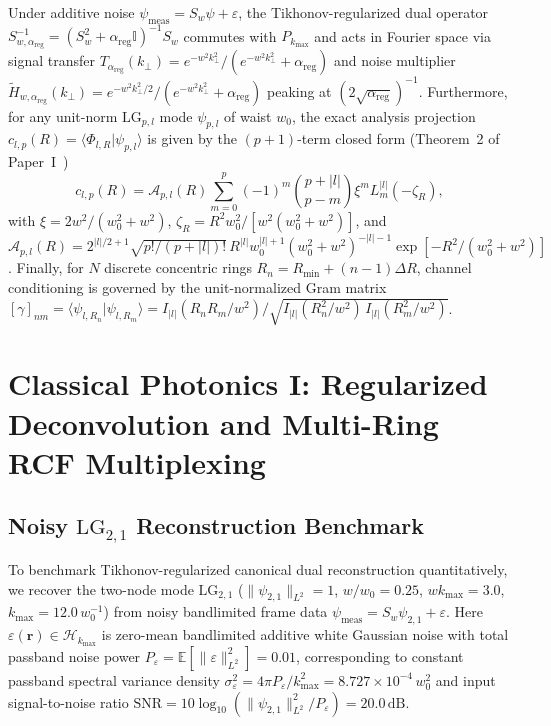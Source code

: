 \documentclass[aps,pra,onecolumn,notitlepage,11pt,tightenlines,nofootinbib,floatfix,longbibliography]{revtex4-2}
\newcommand{\braket}[2]{\langle #1 | #2 \rangle}
\newcommand{\norm}[1]{\lVert #1 \rVert}
\newcommand{\abs}[1]{\lvert #1 \rvert}
\begin{document}
Under additive noise $\psi_{\mathrm{meas}} = S_w\psi + \varepsilon$, the Tikhonov-regularized dual operator $S_{w,\alpha_{\mathrm{reg}}}^{-1} = (S_w^2 + \alpha_{\mathrm{reg}}\mathbb{I})^{-1}S_w$ commutes with $P_{k_{\max}}$ and acts in Fourier space via signal transfer $T_{\alpha_{\mathrm{reg}}}(k_\perp) = e^{-w^2 k_\perp^2}/(e^{-w^2 k_\perp^2}+\alpha_{\mathrm{reg}})$ and noise multiplier $\widetilde{H}_{w,\alpha_{\mathrm{reg}}}(k_\perp) = e^{-w^2 k_\perp^2/2}/(e^{-w^2 k_\perp^2}+\alpha_{\mathrm{reg}})$ peaking at $(2\sqrt{\alpha_{\mathrm{reg}}})^{-1}$. Furthermore, for any unit-norm $\mathrm{LG}_{p,l}$ mode $\psi_{p,l}$ of waist $w_0$, the exact analysis projection $c_{l,p}(R) = \braket{\Phi_{l,R}}{\psi_{p,l}}$ is given by the $(p+1)$-term closed form (Theorem~2 of Paper~I~\cite{AyalaPaperI})
\begin{equation}
c_{l,p}(R) = \mathcal{A}_{p,l}(R) \sum_{m=0}^p (-1)^m \binom{p+\abs{l}}{p-m} \xi^m L_m^{\abs{l}}(-\zeta_R),
\label{eq:c_lp_recap}
\end{equation}
with $\xi = 2w^2/(w_0^2+w^2)$, $\zeta_R = R^2 w_0^2/[w^2(w_0^2+w^2)]$, and $\mathcal{A}_{p,l}(R) = 2^{\abs{l}/2+1}\sqrt{p!/(p+\abs{l})!}\,\allowbreak R^{\abs{l}}w_0^{\abs{l}+1}(w_0^2+w^2)^{-\abs{l}-1}\allowbreak \exp[-R^2/(w_0^2+w^2)]$. Finally, for $N$ discrete concentric rings $R_n = R_{\min} + (n-1)\Delta R$, channel conditioning is governed by the unit-normalized Gram matrix $[\gamma]_{nm} = \braket{\psi_{l,R_n}}{\psi_{l,R_m}} = \allowbreak I_{\abs{l}}(R_n R_m/w^2)/\allowbreak \sqrt{I_{\abs{l}}(R_n^2/w^2)\,I_{\abs{l}}(R_m^2/w^2)}$.

\section{Classical Photonics I: Regularized Deconvolution and Multi-Ring RCF Multiplexing}
\label{sec:classical_sdm}

\subsection{Noisy \texorpdfstring{$\mathrm{LG}_{2,1}$}{LG\_\{2,1\}} Reconstruction Benchmark}
\label{subsec:noisy_lg21}

To benchmark Tikhonov-regularized canonical dual reconstruction quantitatively, we recover the two-node mode $\mathrm{LG}_{2,1}$ ($\norm{\psi_{2,1}}_{L^2} = 1$, $w/w_0 = 0.25$, $w k_{\max} = 3.0$, $k_{\max} = 12.0\,w_0^{-1}$) from noisy bandlimited frame data $\psi_{\mathrm{meas}} = S_w\psi_{2,1} + \varepsilon$. Here $\varepsilon(\mathbf{r}) \in \mathcal{H}_{k_{\max}}$ is zero-mean bandlimited additive white Gaussian noise with total passband noise power $P_\varepsilon = \mathbb{E}[\norm{\varepsilon}_{L^2}^2] = 0.01$, corresponding to constant passband spectral variance density $\sigma_\varepsilon^2 = 4\pi P_\varepsilon/k_{\max}^2 = 8.727\times 10^{-4}\,w_0^2$ and input signal-to-noise ratio $\mathrm{SNR} = 10\log_{10}(\norm{\psi_{2,1}}_{L^2}^2/P_\varepsilon) = 20.0\,\mathrm{dB}$.
\end{document}
